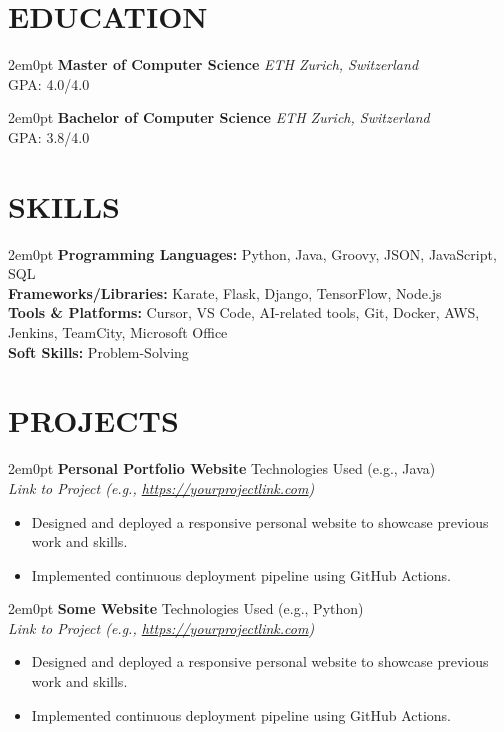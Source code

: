\documentclass[11pt, a4paper]{article} %
\newenvironment{subs}
  {\begin{adjustwidth}{2em}{0pt} \footnotesize} %
  {\end{adjustwidth}}
\newcommand{\subheading}[2]{%
    \footnotesize\textbf{#1} \hfill \emph{#2} \\ %
}
\newcommand{\jobdetails}[3]{%
    \footnotesize \textbf{#1} \hfill #2 \\ %
    \emph{\small #3} \\ %
}
\begin{document}
\section{EDUCATION}
\begin{subs}
\subheading{Master of Computer Science}{ETH Zurich, Switzerland}
    GPA: 4.0/4.0 
\end{subs}
\begin{subs}
\subheading{Bachelor of Computer Science}{ETH Zurich, Switzerland}
    GPA: 3.8/4.0 
\end{subs}

\section{SKILLS}

\begin{subs}
    \textbf{Programming Languages:} Python, Java, Groovy, JSON, JavaScript, SQL \\
    \textbf{Frameworks/Libraries:} Karate, Flask, Django, TensorFlow, Node.js \\
    \textbf{Tools \& Platforms:} Cursor, VS Code, AI-related tools, Git, Docker, AWS, Jenkins, TeamCity, Microsoft Office \\
    \textbf{Soft Skills:} Problem-Solving
\end{subs}

\section{PROJECTS}

\begin{subs}
    \jobdetails{Personal Portfolio Website}{Technologies Used (e.g., Java)}{Link to Project (e.g., \url{https://yourprojectlink.com})}
    \begin{itemize}
        \item Designed and deployed a responsive personal website to showcase previous work and skills.
        \item Implemented continuous deployment pipeline using GitHub Actions.
    \end{itemize}
\end{subs}
\begin{subs}
    \jobdetails{Some Website}{Technologies Used (e.g., Python)}{Link to Project (e.g., \url{https://yourprojectlink.com})}
    \begin{itemize}
        \item Designed and deployed a responsive personal website to showcase previous work and skills.
        \item Implemented continuous deployment pipeline using GitHub Actions.
    \end{itemize}
\end{subs}

\end{document}
